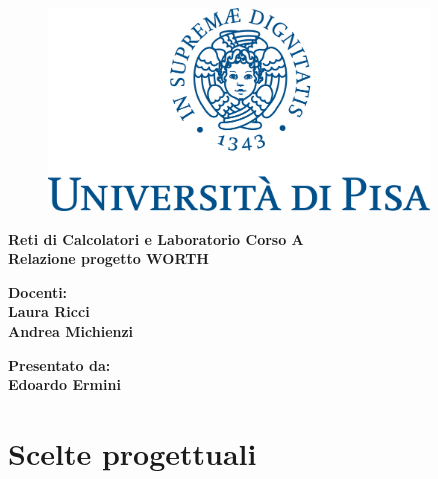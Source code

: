 \documentclass[11pt]{report}
\begin{document}
	
	\begin{titlepage}
		
		\linespread{2}
		
		\begin{figure}[t]
			\centering\includegraphics[width=0.9\textwidth]{unipi_logo}
		\end{figure}
		
		\begin{center}
			\vspace*{5mm}
			{\LARGE{\bf Reti di Calcolatori e Laboratorio Corso A}}\\
			\vspace{5mm}
			{\LARGE{\bf Relazione progetto WORTH}}\\
		\end{center}
		
		\vspace{10mm}
		
		
		\vspace{30mm}
		
		\hfill
		\begin{minipage}[t]{0.47\textwidth}\raggedright
			{\large{\bf Docenti: \\ Laura Ricci\\ \vspace{2mm} Andrea Michienzi }}
		\end{minipage}
		\hfill
		\begin{minipage}[t]{0.47\textwidth}\raggedleft
			{\large{\bf Presentato da: \\ Edoardo Ermini\\ }}
		\end{minipage}
		
	\end{titlepage}

	\tableofcontents
	
	\chapter{Scelte progettuali}
	
\end{document}
